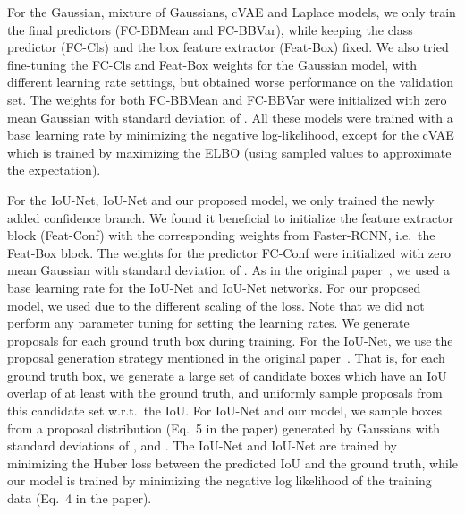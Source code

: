 \documentclass[runningheads]{llncs}
\begin{document}
\begin{appendices}
For the Gaussian, mixture of Gaussians, cVAE and Laplace models, we only train the final predictors (FC-BBMean and FC-BBVar), while keeping the class predictor (FC-Cls) and the box feature extractor (Feat-Box) fixed. We also tried fine-tuning the FC-Cls and Feat-Box weights for the Gaussian model, with different learning rate settings, but obtained worse performance on the validation set. The weights for both FC-BBMean and FC-BBVar were initialized with zero mean Gaussian with standard deviation of . All these models were trained with a base learning rate  by minimizing the negative log-likelihood, except for the cVAE which is trained by maximizing the ELBO (using  sampled  values to approximate the expectation). 

For the IoU-Net, IoU-Net and our proposed model, we only trained the newly added confidence branch. We found it beneficial to initialize the feature extractor block (Feat-Conf) with the corresponding weights from Faster-RCNN, i.e.\ the Feat-Box block. The weights for the predictor FC-Conf were initialized with zero mean Gaussian with standard deviation of . As in the original paper~\cite{jiang2018acquisition}, we used a base learning rate  for the IoU-Net and IoU-Net networks. For our proposed model, we used  due to the different scaling of the loss. Note that we did not perform any parameter tuning for setting the learning rates. We generate  proposals for each ground truth box during training. For the IoU-Net, we use the proposal generation strategy mentioned in the original paper~\cite{jiang2018acquisition}. That is, for each ground truth box, we generate a large set of candidate boxes which have an IoU overlap of at least  with the ground truth, and uniformly sample  proposals from this candidate set w.r.t.\ the IoU. For IoU-Net and our model, we sample boxes from a proposal distribution (Eq.~5 in the paper) generated by  Gaussians with standard deviations of ,  and . The IoU-Net and IoU-Net are trained by minimizing the Huber loss between the predicted IoU and the ground truth, while our model is trained by minimizing the negative log likelihood of the training data (Eq.~4 in the paper).




\end{appendices}
\end{document}
